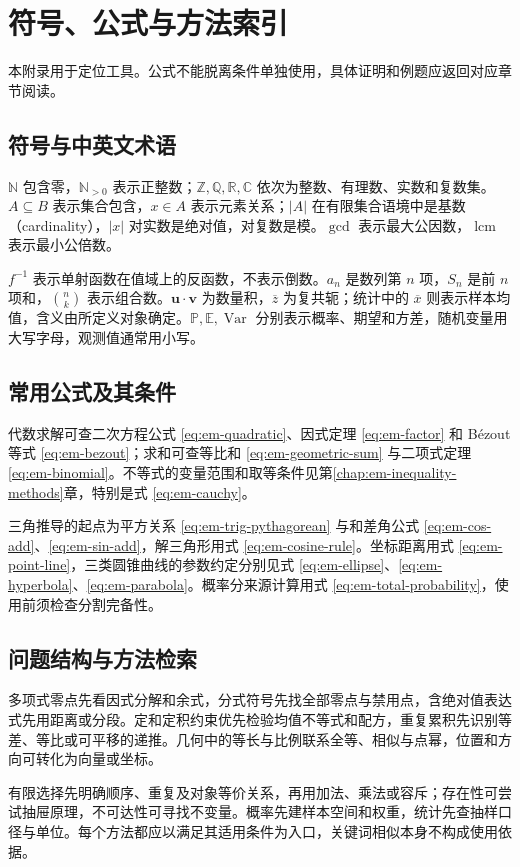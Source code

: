 \setcounter{chapter}{0} %
\chapter{符号、公式与方法索引}
\label{app:em-notation}
本附录用于定位工具。公式不能脱离条件单独使用，具体证明和例题应返回对应章节阅读。

\section{符号与中英文术语}
$\mathbb N$ 包含零，$\mathbb N_{>0}$ 表示正整数；$\mathbb Z,\mathbb Q,\mathbb R,\mathbb C$ 依次为整数、有理数、实数和复数集。$A\subseteq B$ 表示集合包含，$x\in A$ 表示元素关系；$|A|$ 在有限集合语境中是基数（cardinality），$|x|$ 对实数是绝对值，对复数是模。$\gcd$ 表示最大公因数，$\operatorname{lcm}$ 表示最小公倍数。

$f^{-1}$ 表示单射函数在值域上的反函数，不表示倒数。$a_n$ 是数列第 $n$ 项，$S_n$ 是前 $n$ 项和，$\binom nk$ 表示组合数。$\boldsymbol u\cdot\boldsymbol v$ 为数量积，$\overline z$ 为复共轭；统计中的 $\overline x$ 则表示样本均值，含义由所定义对象确定。$\mathbb P,\mathbb E,\operatorname{Var}$ 分别表示概率、期望和方差，随机变量用大写字母，观测值通常用小写。

\section{常用公式及其条件}
代数求解可查二次方程公式 \eqref{eq:em-quadratic}、因式定理 \eqref{eq:em-factor} 和 Bézout 等式 \eqref{eq:em-bezout}；求和可查等比和 \eqref{eq:em-geometric-sum} 与二项式定理 \eqref{eq:em-binomial}。不等式的变量范围和取等条件见第\ref{chap:em-inequality-methods}章，特别是式 \eqref{eq:em-cauchy}。

三角推导的起点为平方关系 \eqref{eq:em-trig-pythagorean} 与和差角公式 \eqref{eq:em-cos-add}、\eqref{eq:em-sin-add}，解三角形用式 \eqref{eq:em-cosine-rule}。坐标距离用式 \eqref{eq:em-point-line}，三类圆锥曲线的参数约定分别见式 \eqref{eq:em-ellipse}、\eqref{eq:em-hyperbola}、\eqref{eq:em-parabola}。概率分来源计算用式 \eqref{eq:em-total-probability}，使用前须检查分割完备性。

\section{问题结构与方法检索}
多项式零点先看因式分解和余式，分式符号先找全部零点与禁用点，含绝对值表达式先用距离或分段。定和定积约束优先检验均值不等式和配方，重复累积先识别等差、等比或可平移的递推。几何中的等长与比例联系全等、相似与点幂，位置和方向可转化为向量或坐标。

有限选择先明确顺序、重复及对象等价关系，再用加法、乘法或容斥；存在性可尝试抽屉原理，不可达性可寻找不变量。概率先建样本空间和权重，统计先查抽样口径与单位。每个方法都应以满足其适用条件为入口，关键词相似本身不构成使用依据。

